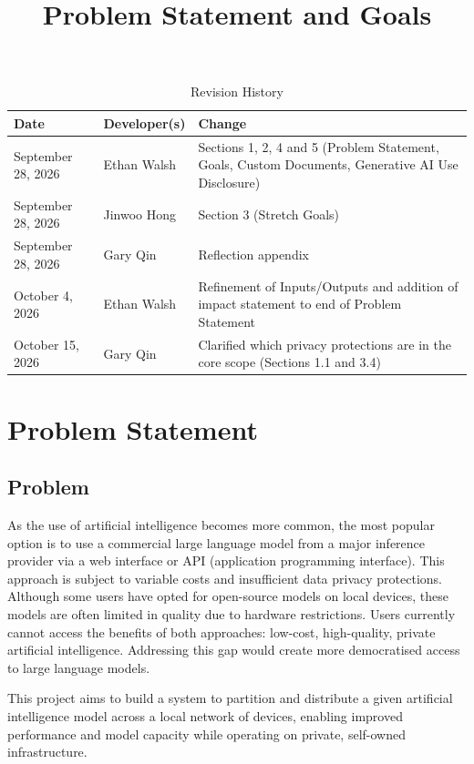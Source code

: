 \documentclass{article}
\title{Problem Statement and Goals\\\progname}
\author{\authname}
\date{}
\begin{document}
\maketitle

\begin{table}[hp]
\caption{Revision History} \label{TblRevisionHistory}
\begin{tabularx}{\textwidth}{llX}
\toprule
\textbf{Date} & \textbf{Developer(s)} & \textbf{Change}\\
\midrule
September 28, 2026 & Ethan Walsh & Sections 1, 2, 4 and 5 (Problem
  Statement, Goals, Custom Documents, Generative AI Use Disclosure)\\
September 28, 2026 & Jinwoo Hong & Section 3 (Stretch Goals)\\
September 28, 2026 & Gary Qin & Reflection appendix\\
October 4, 2026 & Ethan Walsh & Refinement of Inputs/Outputs and addition of impact statement to end of Problem Statement\\
October 15, 2026 & Gary Qin & Clarified which privacy protections are in the core scope (Sections 1.1 and 3.4)\\
\bottomrule
\end{tabularx}
\end{table}

\section{Problem Statement}

\subsection{Problem}

As the use of artificial intelligence becomes more common, the most 
popular option is to use a commercial large language model from a major inference 
provider via a web interface or API (application programming interface). This approach is subject to variable costs 
and insufficient data privacy protections. Although some users have opted for 
open-source models on local devices, these models are often limited in quality 
due to hardware restrictions. Users currently cannot access the benefits of 
both approaches: low-cost, high-quality, private artificial intelligence. 
Addressing this gap would create more democratised access to large language models. 

This project aims to build a system to partition and distribute a given artificial
intelligence model across a local network of devices, enabling improved performance
and model capacity while operating on private, self-owned infrastructure.
\end{document}
